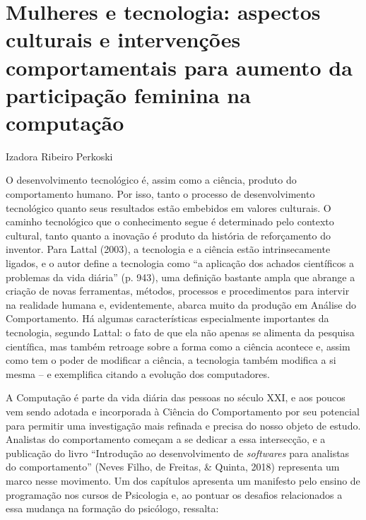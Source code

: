 \setcounter{footnote}{0}
\setcounter{figure}{0}
\setcounter{table}{0}
\chapter*{Mulheres e tecnologia: aspectos culturais e intervenções comportamentais para aumento da participação feminina na computação}
\begin{flushright}
\begin{small}
    Izadora Ribeiro Perkoski  
\end{small}
\vspace{1cm}
\end{flushright}

O desenvolvimento tecnológico é, assim como a ciência, produto do comportamento humano. Por isso, tanto o processo de desenvolvimento tecnológico quanto seus resultados estão embebidos em valores culturais. O caminho tecnológico que o conhecimento segue é determinado pelo contexto cultural, tanto quanto a inovação é produto da história de reforçamento do inventor. Para Lattal (2003), a tecnologia e a ciência estão intrinsecamente ligados, e o autor define a tecnologia como “a aplicação dos achados científicos a problemas da vida diária” (p. 943), uma definição bastante ampla que abrange a criação de novas ferramentas, métodos, processos e procedimentos para intervir na realidade humana e, evidentemente, abarca muito da produção em Análise do Comportamento. Há algumas características especialmente importantes da tecnologia, segundo Lattal: o fato de que ela não apenas se alimenta da pesquisa científica, mas também retroage sobre a forma como a ciência acontece e, assim como tem o poder de modificar a ciência, a tecnologia também modifica a si mesma – e exemplifica citando a evolução dos computadores.

A Computação é parte da vida diária das pessoas no século XXI, e aos poucos vem sendo adotada e incorporada à Ciência do Comportamento por seu potencial para permitir uma investigação mais refinada e precisa do nosso objeto de estudo. Analistas do comportamento começam a se dedicar a essa intersecção, e a publicação do livro “Introdução ao desenvolvimento de \textit{softwares} para analistas do comportamento” (Neves Filho, de Freitas, \& Quinta, 2018) representa um marco nesse movimento. Um dos capítulos apresenta um manifesto pelo ensino de programação nos cursos de Psicologia e, ao pontuar os desafios relacionados a essa mudança na formação do psicólogo, ressalta:

